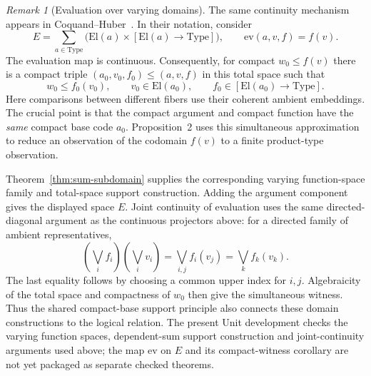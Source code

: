 \documentclass[11pt,a4paper]{article}
\theoremstyle{definition}
\theoremstyle{remark}
\newtheorem{remark}[theorem]{Remark}
\newcommand{\lub}{\bigvee}
\begin{document}
\begin{remark}[Evaluation over varying domains]\label{rem:varying-evaluation}
The same continuity mechanism appears in Coquand--Huber~\cite[p.~653
and Proposition~2, p.~658]{coquand-huber}. In their notation, consider
\[
 E=\sum_{a\in\mathrm{Type}}
 \bigl(\mathrm{El}(a)\times[\mathrm{El}(a)\to\mathrm{Type}]\bigr),
 \qquad \mathrm{ev}(a,v,f)=f(v).
\]
The evaluation map is continuous. Consequently, for compact
$w_0\leq f(v)$ there is a compact triple $(a_0,v_0,f_0)\leq(a,v,f)$
in this total space such that
\[
 w_0\leq f_0(v_0),\qquad
 v_0\in\mathrm{El}(a_0),\qquad
 f_0\in[\mathrm{El}(a_0)\to\mathrm{Type}].
\]
Here comparisons between different fibers use their coherent ambient
embeddings. The crucial point is that the compact argument and compact
function have the \emph{same} compact base code $a_0$.
Proposition~2 uses this simultaneous approximation to reduce an
observation of the codomain $f(v)$ to a finite product-type observation.

Theorem~\ref{thm:sum-subdomain} supplies the corresponding varying
function-space family and total-space support construction. Adding the
argument component gives the displayed space $E$. Joint continuity of
evaluation uses the same directed-diagonal argument as the continuous
projectors above: for a directed family of ambient representatives,
\[
 (\lub_i f_i)(\lub_i v_i)
   =\lub_{i,j}f_i(v_j)=\lub_k f_k(v_k).
\]
The last equality follows by choosing a common upper index for $i,j$.
Algebraicity of the total space and compactness of $w_0$ then give the
simultaneous witness. Thus the shared compact-base support principle
also connects these domain constructions to the logical relation.
The present Unit development checks the varying function spaces,
dependent-sum support construction and joint-continuity arguments used
above; the map $\mathrm{ev}$ on $E$ and its compact-witness corollary
are not yet packaged as separate checked theorems.
\end{remark}
\end{document}
